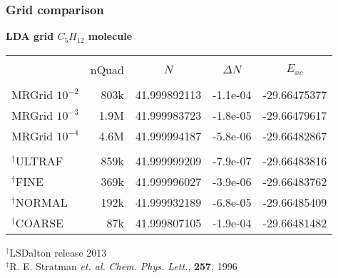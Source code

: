 \begin{frame}
\frametitle{Grid comparison}
\centering

\textbf{LDA grid $C_{5}H_{12}$ molecule}
\begin{table}
\centering
\begin{tabular}{lr|rrr}
\hline
\hline
                 &       &            &        &            \\
\multicolumn{1}{c}{}&
\multicolumn{1}{c|}{nQuad}&
\multicolumn{1}{c}{$N$}&
\multicolumn{1}{c}{$\Delta N$}&
\multicolumn{1}{c}{$E_{xc}$}\\
                 &       &            &        &            \\
MRGrid $10^{-2}$ &   803k&41.999892113&-1.1e-04&-29.66475377\\
MRGrid $10^{-3}$ &   1.9M&41.999983723&-1.8e-05&-29.66479617\\
MRGrid $10^{-4}$ &   4.6M&41.999994187&-5.8e-06&-29.66482867\\
                 &       &            &        &            \\
$^\dag$ULTRAF    &   859k&41.999999209&-7.9e-07&-29.66483816\\
$^\dag$FINE      &   369k&41.999996027&-3.9e-06&-29.66483762\\
$^\dag$NORMAL    &   192k&41.999932189&-6.8e-05&-29.66485409\\
$^\dag$COARSE    &    87k&41.999807105&-1.9e-04&-29.66481482\\
\hline
\hline
\end{tabular}
\end{table}

\vspace{5mm}

$^\dag$LSDalton release 2013\\
$^\dag$R. E. Stratman {\it et. al.}
{\it Chem. Phys. Lett.}, \textbf{257}, 1996


\end{frame}

